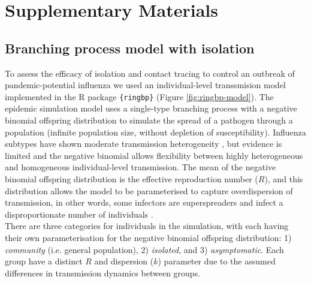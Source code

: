 \documentclass{article}
\begin{document}
\section*{Supplementary Materials}

\subsection*{Branching process model with isolation}

To assess the efficacy of isolation and contact tracing to control an outbreak of pandemic-potential influenza we used an individual-level transsmision model implemented in the R package \texttt{\{ringbp\}} \citep{hellewellRingbpSimulateEvaluate2025} (Figure \ref{fig:ringbp-model}). The epidemic simulation model uses a single-type branching process with a negative binomial offspring distribution to simulate the spread of a pathogen through a population (infinite population size, without depletion of susceptibility). Influenza subtypes have shown moderate transmission heterogeneity \citep{fraserPandemicPotentialStrain2009, heComparingCOVID191918192020, Ward2024.12.11.24318702}, but evidence is limited and the negative binomial allows flexibility between highly heterogeneous and homogeneous individual-level transmission. The mean of the negative binomial offspring distribution is the effective reproduction number ($R$), and this distribution allows the model to be parameterised to capture overdispersion of transmission, in other words, some infectors are superspreaders and infect a disproportionate number of individuals \citep{lloyd-smithSuperspreadingEffectIndividual2005, kucharskiEarlyDynamicsTransmission2020}. \\

There are three categories for individuals in the simulation, with each having their own parameterisation for the negative binomial offspring distribution: 1) \textit{community} (i.e. general population), 2) \textit{isolated}, and 3) \textit{asymptomatic}. Each group have a distinct $R$ and dispersion ($k$) parameter due to the assumed differences in transmission dynamics between groups. \\

\end{document}
